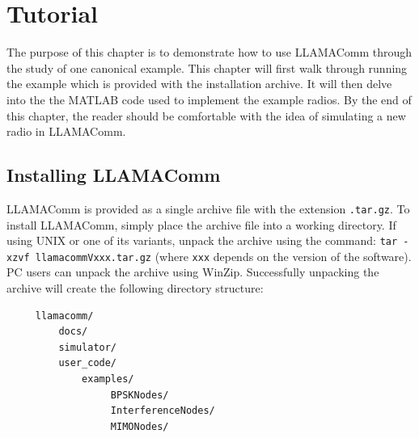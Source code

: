 %  
% 
% 
% 
% 
\chapter{Tutorial} \label{chp:tutorial}

The purpose of this chapter is to demonstrate how to use LLAMAComm
through the study of one canonical example.  This chapter will first
walk through running the example which is provided with the
installation archive.  It will then delve into the the MATLAB code
used to implement the example radios.  By the end of this chapter,
the reader should be comfortable with the idea of simulating a new
radio in LLAMAComm.

\section{Installing LLAMAComm}

LLAMAComm is provided as a single archive file with the extension
\verb+.tar.gz+.  To install LLAMAComm, simply place the archive file
into a working directory.  If using UNIX or one of its variants,
unpack the archive using the command: \verb+tar -xzvf llamacommVxxx.tar.gz+
(where \verb+xxx+ depends on the version of
the software).  PC users can unpack the archive using WinZip.
Successfully unpacking the archive will create the following
directory structure:

\begin{verbatim}
     llamacomm/
         docs/
         simulator/
         user_code/
             examples/
                  BPSKNodes/
                  InterferenceNodes/
                  MIMONodes/
\end{verbatim}

